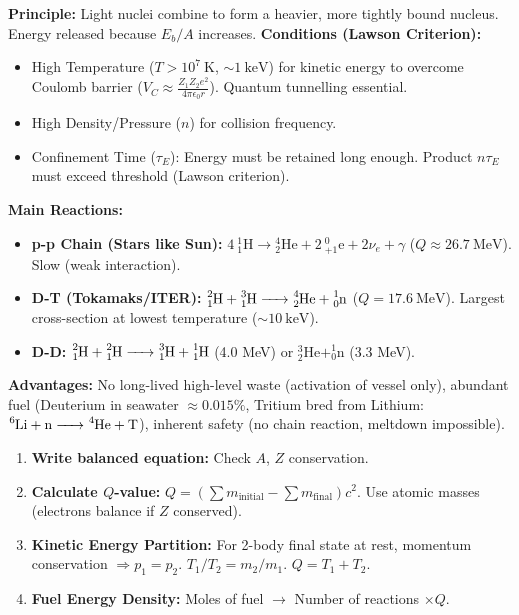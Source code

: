 \documentclass[11pt]{article}
\begin{document}
\begin{propriete}
\textbf{Principle:} Light nuclei combine to form a heavier, more tightly bound nucleus. Energy released because $E_b/A$ increases.
\textbf{Conditions (Lawson Criterion):}
\begin{itemize}
\item High Temperature ($T > 10^7\ \text{K}$, $\sim 1\ \text{keV}$) for kinetic energy to overcome Coulomb barrier ($V_C \approx \frac{Z_1 Z_2 e^2}{4\pi\epsilon_0 r}$). Quantum tunnelling essential.
\item High Density/Pressure ($n$) for collision frequency.
\item Confinement Time ($\tau_E$): Energy must be retained long enough. Product $n\tau_E$ must exceed threshold (Lawson criterion).
\end{itemize}
\textbf{Main Reactions:}
\begin{itemize}
\item \textbf{p-p Chain (Stars like Sun):} $4\ \ensuremath{\mathrm{^{1}_{1}H}} \to \ensuremath{\mathrm{^{4}_{2}He}} + 2\ \ensuremath{\mathrm{^{0}_{+1}e}} + 2\nu_e + \gamma$ ($Q \approx 26.7\ \text{MeV}$). Slow (weak interaction).
\item \textbf{D-T (Tokamaks/ITER):} $\ce{^{2}_{1}H + ^{3}_{1}H -> ^{4}_{2}He + ^{1}_{0}n}$ ($Q = 17.6\ \text{MeV}$). Largest cross-section at lowest temperature ($\sim 10\ \text{keV}$).
\item \textbf{D-D:} $\ce{^{2}_{1}H + ^{2}_{1}H -> ^{3}_{1}H + ^{1}_{1}H}$ (4.0 MeV) or $\ensuremath{\mathrm{^{3}_{2}He + ^{1}_{0}n}}$ (3.3 MeV).
\end{itemize}
\textbf{Advantages:} No long-lived high-level waste (activation of vessel only), abundant fuel (Deuterium in seawater $\approx 0.015\%$, Tritium bred from Lithium: $\ce{^{6}Li + n -> ^{4}He + T}$), inherent safety (no chain reaction, meltdown impossible).
\end{propriete}

\begin{methode}
\begin{enumerate}
\item \textbf{Write balanced equation:} Check $A$, $Z$ conservation.
\item \textbf{Calculate $Q$-value:} $Q = (\sum m_{\text{initial}} - \sum m_{\text{final}}) c^2$. Use atomic masses (electrons balance if $Z$ conserved).
\item \textbf{Kinetic Energy Partition:} For 2-body final state at rest, momentum conservation $\Rightarrow p_1 = p_2$. $T_1/T_2 = m_2/m_1$. $Q = T_1 + T_2$.
\item \textbf{Fuel Energy Density:} Moles of fuel $\to$ Number of reactions $\times Q$.
\end{enumerate}
\end{methode}
\end{document}
